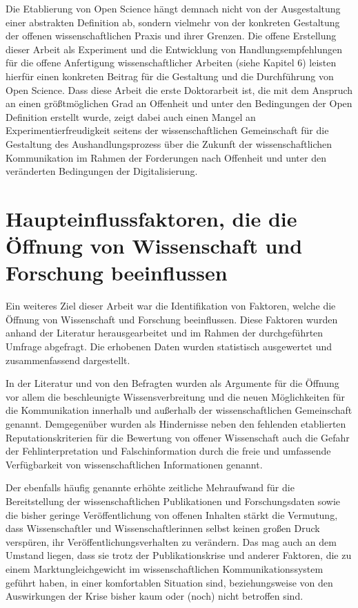 Die Etablierung von Open Science hängt demnach nicht von der Ausgestaltung einer abstrakten Definition ab, sondern vielmehr von der konkreten Gestaltung der offenen wissenschaftlichen Praxis und ihrer Grenzen. Die offene Erstellung dieser Arbeit als Experiment und die Entwicklung von Handlungsempfehlungen für die offene Anfertigung wissenschaftlicher Arbeiten (siehe Kapitel 6) leisten hierfür einen konkreten Beitrag für die Gestaltung und die Durchführung von Open Science. Dass diese Arbeit die erste Doktorarbeit ist, die mit dem Anspruch an einen größtmöglichen Grad an Offenheit und unter den Bedingungen der Open Definition erstellt wurde, zeigt dabei auch einen Mangel an Experimentierfreudigkeit seitens der wissenschaftlichen Gemeinschaft für die Gestaltung des Aushandlungsprozess über die Zukunft der wissenschaftlichen Kommunikation im Rahmen der Forderungen nach Offenheit und unter den veränderten Bedingungen der Digitalisierung.

\section{Haupteinflussfaktoren, die die Öffnung von Wissenschaft und Forschung beeinflussen}

Ein weiteres Ziel dieser Arbeit war die Identifikation von Faktoren, welche die Öffnung von Wissenschaft und Forschung beeinflussen. Diese Faktoren wurden anhand der Literatur herausgearbeitet und im Rahmen der durchgeführten Umfrage abgefragt. Die erhobenen Daten wurden statistisch ausgewertet und zusammenfassend dargestellt.

In der Literatur und von den Befragten wurden als Argumente für die Öffnung vor allem die beschleunigte Wissensverbreitung und die neuen Möglichkeiten für die Kommunikation innerhalb und außerhalb der wissenschaftlichen Gemeinschaft genannt. Demgegenüber wurden als Hindernisse neben den fehlenden etablierten Reputationskriterien für die Bewertung von offener Wissenschaft auch die Gefahr der Fehlinterpretation und Falschinformation durch die freie und umfassende Verfügbarkeit von wissenschaftlichen Informationen genannt.

Der ebenfalls häufig genannte erhöhte zeitliche Mehraufwand für die Bereitstellung der wissenschaftlichen Publikationen und Forschungsdaten sowie die bisher geringe Veröffentlichung von offenen Inhalten stärkt die Vermutung, dass Wissenschaftler und Wissenschaftlerinnen selbst keinen großen Druck verspüren, ihr Veröffentlichungsverhalten zu verändern. Das mag auch an dem Umstand liegen, dass sie trotz der Publikationskrise und anderer Faktoren, die zu einem Marktungleichgewicht im wissenschaftlichen Kommunikationssystem geführt haben, in einer komfortablen Situation sind, beziehungsweise von den Auswirkungen der Krise bisher kaum oder (noch) nicht betroffen sind.

